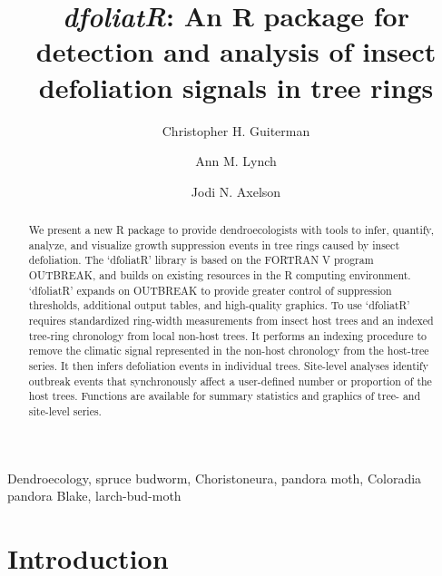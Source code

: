 \documentclass[review]{elsarticle} %
\begin{document}
\begin{frontmatter}

  \title{\emph{dfoliatR}: An R package for detection and analysis of insect
defoliation signals in tree rings}
    \author[a,b]{Christopher H. Guiterman}
    \author[a,c]{Ann M. Lynch}
    \author[c]{Jodi N. Axelson}
      \address[a]{Laboratory of Tree-Ring Research, University of Arizona, 1215 E Lowell
St.~Box 210045, Tucson, AZ, 85721}
    \address[b]{Three Pines Forest Research, LLC, PO Box 225, Etna, NH, 03750}
    \address[c]{U.S. Forest Service, Rocky Mountain Research Station, 1215 E Lowell
St.~Box 210045, Tucson, AZ, 85721}
    \address[d]{Dept of Environmental Science, Policy \& Management, University of
California, Berkeley, Berkeley, CA 94720}
  
  \begin{abstract}
  We present a new R package to provide dendroecologists with tools to
  infer, quantify, analyze, and visualize growth suppression events in
  tree rings caused by insect defoliation. The `dfoliatR' library is based
  on the FORTRAN V program OUTBREAK, and builds on existing resources in
  the R computing environment. `dfoliatR' expands on OUTBREAK to provide
  greater control of suppression thresholds, additional output tables, and
  high-quality graphics. To use `dfoliatR' requires standardized
  ring-width measurements from insect host trees and an indexed tree-ring
  chronology from local non-host trees. It performs an indexing procedure
  to remove the climatic signal represented in the non-host chronology
  from the host-tree series. It then infers defoliation events in
  individual trees. Site-level analyses identify outbreak events that
  synchronously affect a user-defined number or proportion of the host
  trees. Functions are available for summary statistics and graphics of
  tree- and site-level series.
  
  \hfill\break
  \end{abstract}
   \begin{keyword} Dendroecology, spruce budworm, Choristoneura, pandora moth, Coloradia
pandora Blake, larch-bud-moth \newpage\end{keyword}
 \end{frontmatter}

\hypertarget{introduction}{%
\section{Introduction}\label{introduction}}
\end{document}

